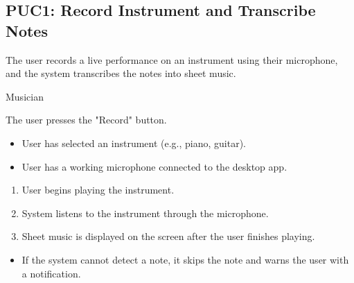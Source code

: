 \documentclass[12pt]{article}
\begin{document}
\subsection*{PUC1: Record Instrument and Transcribe Notes}
\begin{description}[style=nextline]
    \item[Description:] The user records a live performance on an instrument using their microphone, and the system transcribes the notes into sheet music.
    \item[Primary Actor:] Musician
    \item[Trigger:] The user presses the "Record" button.
    \item[Preconditions:]
    \begin{itemize}
        \item User has selected an instrument (e.g., piano, guitar).
        \item User has a working microphone connected to the desktop app.
    \end{itemize}
    \item[Main Success Scenario:]
    \begin{enumerate}
        \item User begins playing the instrument.
        \item System listens to the instrument through the microphone.
        \item Sheet music is displayed on the screen after the user finishes playing.
    \end{enumerate}
    \item[Exceptions:]
    \begin{itemize}
        \item If the system cannot detect a note, it skips the note and warns the user with a notification.
    \end{itemize}
\end{description}
\end{document}
